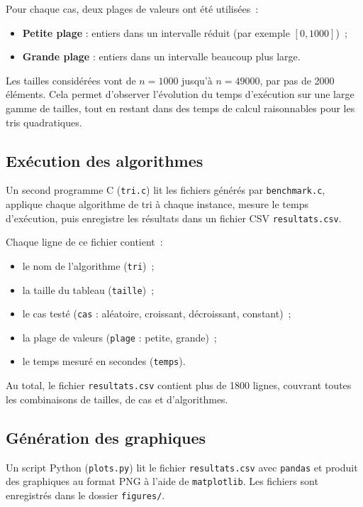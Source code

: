 \documentclass[11pt,a4paper]{article}
\begin{document}
Pour chaque cas, deux plages de valeurs ont été utilisées~:

\begin{itemize}
  \item \textbf{Petite plage} : entiers dans un intervalle réduit
        (par exemple $[0,1000]$)~;
  \item \textbf{Grande plage} : entiers dans un intervalle beaucoup
        plus large.
\end{itemize}

Les tailles considérées vont de $n=1000$ jusqu'à $n=49000$, par pas
de 2000 éléments.  
Cela permet d'observer l'évolution du temps d'exécution sur une large
gamme de tailles, tout en restant dans des temps de calcul raisonnables
pour les tris quadratiques.

\subsection{Exécution des algorithmes}

Un second programme C (\texttt{tri.c}) lit les fichiers générés par
\texttt{benchmark.c}, applique chaque algorithme de tri à chaque
instance, mesure le temps d'exécution, puis enregistre les résultats
dans un fichier CSV \texttt{resultats.csv}.

Chaque ligne de ce fichier contient~:

\begin{itemize}
  \item le nom de l'algorithme (\texttt{tri})~;
  \item la taille du tableau (\texttt{taille})~;
  \item le cas testé (\texttt{cas} : aléatoire, croissant,
        décroissant, constant)~;
  \item la plage de valeurs (\texttt{plage} : petite, grande)~;
  \item le temps mesuré en secondes (\texttt{temps}).
\end{itemize}

Au total, le fichier \texttt{resultats.csv} contient plus de 1800
lignes, couvrant toutes les combinaisons de tailles, de cas et
d'algorithmes.

\subsection{Génération des graphiques}

Un script Python (\texttt{plots.py}) lit le fichier
\texttt{resultats.csv} avec \texttt{pandas} et produit des graphiques
au format PNG à l'aide de \texttt{matplotlib}.  
Les fichiers sont enregistrés dans le dossier \texttt{figures/}.
\end{document}
